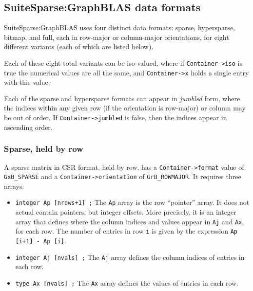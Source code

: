 \newpage
\subsection{SuiteSparse:GraphBLAS data formats}
\label{formats}

SuiteSparse:GraphBLAS uses four distinct data formats: sparse, hypersparse,
bitmap, and full, each in row-major or column-major orientations, for eight
different variants (each of which are listed below).

Each of these eight total variants can be iso-valued, where if
\verb'Container->iso' is true the numerical values are all the same, and
\verb'Container->x' holds a single entry with this value.

Each of the sparse and hypersparse formats can appear in {\em jumbled} form,
where the indices within any given row (if the orientation is row-major)
or column may be out of order.  If \verb'Container->jumbled' is false, then
the indices appear in ascending order.

\subsubsection{Sparse, held by row}
\label{format_sparse_by_row}

A sparse matrix in CSR format, held by row, has a \verb'Container->format'
value of \verb'GxB_SPARSE' and a \verb'Container->orientation' of
\verb'GrB_ROWMAJOR'.  It requires three arrays:

\begin{itemize}
\item \verb'integer Ap [nrows+1] ;'  The \verb'Ap' array is the row
``pointer'' array.  It does not actual contain pointers, but integer offsets.
More precisely, it is an integer array that defines where the column indices
and values appear in \verb'Aj' and \verb'Ax', for each row.  The number of
entries in row \verb'i' is given by the expression \verb'Ap [i+1] - Ap [i]'.

\item \verb'integer Aj [nvals] ;'  The \verb'Aj' array defines the
column indices of entries in each row.

\item \verb'type Ax [nvals] ;'  The \verb'Ax' array defines the values of
entries in each row.  
\end{itemize}

